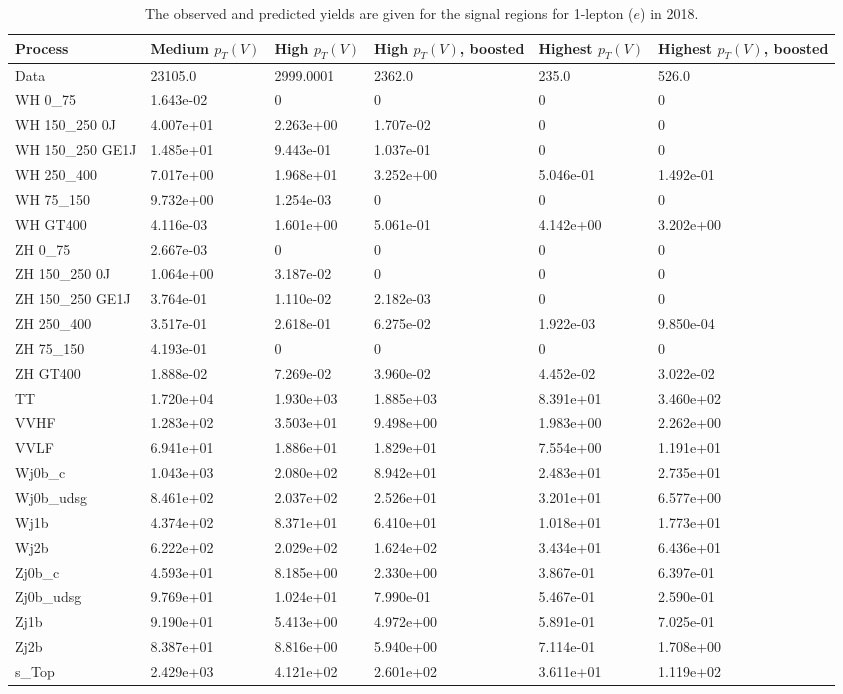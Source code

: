 \begin{table}
\centering
\caption[2018 1-lepton ($e$) signal selection yields]{
                  The observed and predicted yields are given for the
                  signal regions for 1-lepton ($e$) in 2018.
                  }
{\footnotesize
\begin{tabularx}{\textwidth}{|X|X|X|X|X|X|}
\hline
Process & Medium $p_{T}(V)$ & High $p_{T}(V)$ & High $p_{T}(V)$, boosted & Highest $p_{T}(V)$ & Highest $p_{T}(V)$, boosted \\
\hline
Data & 23105.0 & 2999.0001 & 2362.0 & 235.0 & 526.0 \\
\hline
WH 0\_75 & 1.643e-02 & 0 & 0 & 0 & 0 \\
WH 150\_250 0J & 4.007e+01 & 2.263e+00 & 1.707e-02 & 0 & 0 \\
WH 150\_250 GE1J & 1.485e+01 & 9.443e-01 & 1.037e-01 & 0 & 0 \\
WH 250\_400 & 7.017e+00 & 1.968e+01 & 3.252e+00 & 5.046e-01 & 1.492e-01 \\
WH 75\_150 & 9.732e+00 & 1.254e-03 & 0 & 0 & 0 \\
WH GT400 & 4.116e-03 & 1.601e+00 & 5.061e-01 & 4.142e+00 & 3.202e+00 \\
ZH 0\_75 & 2.667e-03 & 0 & 0 & 0 & 0 \\
ZH 150\_250 0J & 1.064e+00 & 3.187e-02 & 0 & 0 & 0 \\
ZH 150\_250 GE1J & 3.764e-01 & 1.110e-02 & 2.182e-03 & 0 & 0 \\
ZH 250\_400 & 3.517e-01 & 2.618e-01 & 6.275e-02 & 1.922e-03 & 9.850e-04 \\
ZH 75\_150 & 4.193e-01 & 0 & 0 & 0 & 0 \\
ZH GT400 & 1.888e-02 & 7.269e-02 & 3.960e-02 & 4.452e-02 & 3.022e-02 \\
\hline
TT & 1.720e+04 & 1.930e+03 & 1.885e+03 & 8.391e+01 & 3.460e+02 \\
VVHF & 1.283e+02 & 3.503e+01 & 9.498e+00 & 1.983e+00 & 2.262e+00 \\
VVLF & 6.941e+01 & 1.886e+01 & 1.829e+01 & 7.554e+00 & 1.191e+01 \\
Wj0b\_c & 1.043e+03 & 2.080e+02 & 8.942e+01 & 2.483e+01 & 2.735e+01 \\
Wj0b\_udsg & 8.461e+02 & 2.037e+02 & 2.526e+01 & 3.201e+01 & 6.577e+00 \\
Wj1b & 4.374e+02 & 8.371e+01 & 6.410e+01 & 1.018e+01 & 1.773e+01 \\
Wj2b & 6.222e+02 & 2.029e+02 & 1.624e+02 & 3.434e+01 & 6.436e+01 \\
Zj0b\_c & 4.593e+01 & 8.185e+00 & 2.330e+00 & 3.867e-01 & 6.397e-01 \\
Zj0b\_udsg & 9.769e+01 & 1.024e+01 & 7.990e-01 & 5.467e-01 & 2.590e-01 \\
Zj1b & 9.190e+01 & 5.413e+00 & 4.972e+00 & 5.891e-01 & 7.025e-01 \\
Zj2b & 8.387e+01 & 8.816e+00 & 5.940e+00 & 7.114e-01 & 1.708e+00 \\
s\_Top & 2.429e+03 & 4.121e+02 & 2.601e+02 & 3.611e+01 & 1.119e+02 \\
\hline
\end{tabularx}
}
\label{tab:sr-Wen-2018}
\end{table}

